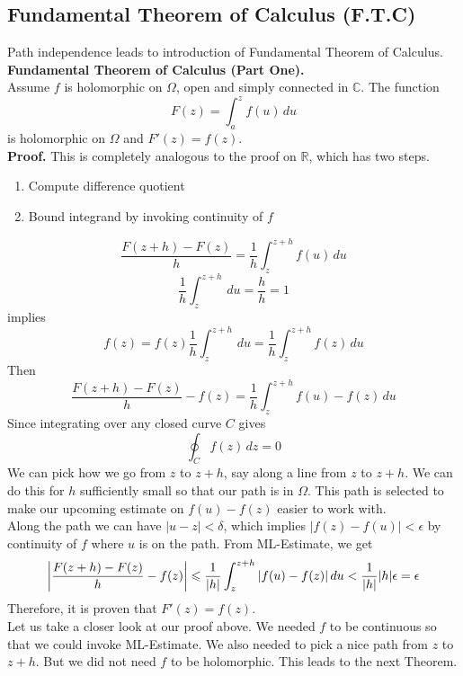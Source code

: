 \documentclass[11pt]{article}
\newcommand*\circled[1]{\tikz[baseline=(char.base)]{
            \node[shape=circle,draw,inner sep=2pt] (char) {#1};}}
\DeclarePairedDelimiter\abs{\lvert}{\rvert}
\begin{document}
\subsection{Fundamental Theorem of Calculus (F.T.C)} 
Path independence leads to introduction of Fundamental Theorem of Calculus. \\
\newline
\textbf{Fundamental Theorem of Calculus (Part One).} \\
Assume $f$ is holomorphic on $\Omega$, open and simply connected in $\mathbb{C}$. The function 
$$F(z) = \int_a^z f(u) \,du$$
is holomorphic on $\Omega$ and $F'(z) = f(z)$. \\
\textbf{Proof.} This is completely analogous to the proof on $\mathbb{R}$, which has two steps.
\begin{enumerate}
\item Compute difference quotient 
\item Bound integrand by invoking continuity of $f$ 
\end{enumerate}
\circled{\scriptsize1}
\begin{equation*}
\frac{F(z+h) - F(z)}{h} = \frac{1}{h}\int_z^{z+h} f(u) \,du 
\end{equation*}
$$\frac{1}{h}\int_z^{z+h}\,du = \frac{h}{h} = 1$$
implies
$$f(z) = f(z)\frac{1}{h}\int_z^{z+h}\,du = \frac{1}{h}\int_z^{z+h}f(z) \,du$$
Then 
$$\frac{F(z+h) - F(z)}{h} - f(z) = \frac{1}{h}\int_z^{z+h}f(u) - f(z) \,du$$
\circled{\scriptsize2} Since integrating over any closed curve $C$ gives 
$$\oint_C f(z) \,dz = 0$$
We can pick how we go from $z$ to $z +h$, say along a line from $z$ to $z + h$. We can do this for $h$ sufficiently small so that our path is in $\Omega$. This path is selected to make our upcoming estimate on $f(u) - f(z)$ easier to work with. \\
Along the path we can have $|u - z| < \delta$, which implies $|f(z) - f(u)| < \epsilon$ by continuity of $f$ where $u$ is on the path. From ML-Estimate, we get 
$$\abs*{\frac{F(z+h) - F(z)}{h} - f(z)} \leqslant \frac{1}{|h|}\int_z^{z+h}|f(u) - f(z)|\,du < \frac{1}{|h|}|h|\epsilon = \epsilon$$
Therefore, it is proven that $F'(z) = f(z)$. \\
\newline
Let us take a closer look at our proof above. We needed $f$ to be continuous so that we could invoke ML-Estimate. We also needed to pick a nice path from $z$ to $z + h$. But we did not need $f$ to be holomorphic. This leads to the next Theorem. \\
\newline
\end{document}
